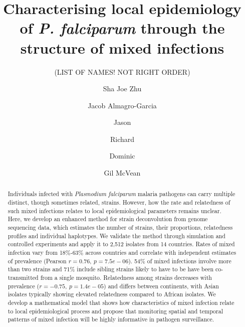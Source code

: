\documentclass[9pt,lineno]{elife}
\newcounter{todocounter}
\newcommand{\done}[2][]
{\todo[color=green!40, #1]{#2}}
\newcommand{\donenum}[2][]
{\stepcounter{todocounter}\done[#1]{\thetodocounter: #2}}
\begin{document}
\title{Characterising local epidemiology of {\it P. falciparum} through the structure of mixed infections}
\newcommand\shorttitle{Mixed infections in malaria}
\date{}

\author{(LIST OF NAMES! NOT RIGHT ORDER)}
\author[1]{Sha Joe Zhu}
\author[1,2,3,4]{Jacob Almagro-Garcia}
\author[1]{Jason}
\author[2,3,4]{Richard}
\author[1,2,3,4]{Dominic}
\author[1,3]{Gil McVean}



\maketitle
{}
\listoftodos
{}





\begin{abstract}
Individuals infected with {\it Plasmodium falciparum} malaria pathogens can carry multiple distinct, though sometimes related, strains.  However, how the rate and relatedness of such mixed infections relates to local epidemiological parameters remains unclear.  Here, we develop an enhanced method for strain deconvolution from genome sequencing data, which estimates the number of strains, their proportions, relatedness profiles and individual haplotypes.  We validate the method through simulation and controlled experiments and apply it to 2,512 isolates from 14 countries.  Rates of mixed infection vary from 18\%-63\% across countries and correlate with independent estimates of prevalence (Pearson $r = 0.76,~p = 7.5e-06$).  54\% of mixed infections involve more than two strains and 71\% include sibling strains likely to have to be have been co-transmitted from a single mosquito.  Relatedness among strains decreases with prevalence ($r = -0.75,~p = 1.4e-05$) and differs between continents, with Asian isolates typically showing elevated relatedness compared to African isolates.  We develop a mathematical model that shows how characteristics of mixed infection relate to local epidemiological process and propose that monitoring spatial and temporal patterns of mixed infection will be highly informative in pathogen surveillance.
\end{abstract}
\end{document}
